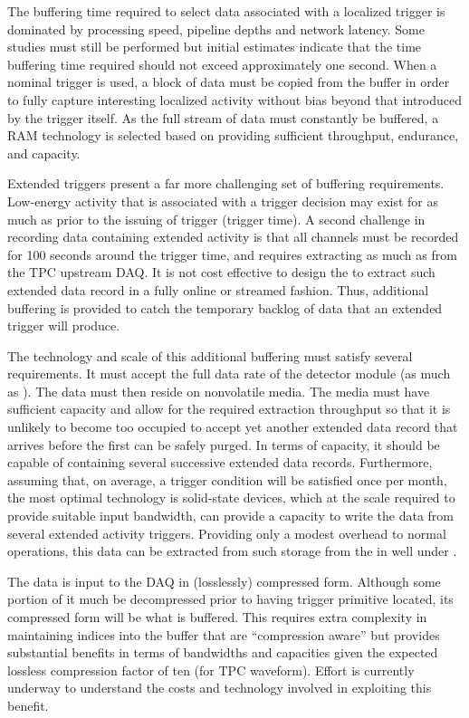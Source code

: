 The buffering time required to select data associated with a localized trigger
is dominated by processing speed, pipeline depths and network latency.
Some studies must still be performed but initial estimates indicate that the
time buffering time required should not exceed approximately one second. 
When a nominal trigger is used, a \dpreadout block of data must be copied from
the buffer in order to fully capture interesting localized activity without bias
beyond that introduced by the trigger itself.
As the full stream of data must constantly be buffered, a RAM technology is
selected based on providing sufficient throughput, endurance, and capacity. 

Extended triggers present a far more challenging set of buffering requirements.  
Low-energy activity that is associated with a  trigger decision may
exist for as much as \snbpretime prior to the issuing of  trigger
(trigger time).
A second challenge in recording data containing extended activity is that all
channels must be recorded for 100 seconds around the trigger time, and requires
extracting as much as  from the TPC upstream DAQ.
It is not cost effective to design the  to extract such extended data
record in a fully online or streamed fashion.
Thus, additional buffering is provided to catch the temporary backlog of data
that an extended trigger will produce.

The technology and scale of this additional buffering must satisfy several
requirements. 
It must accept the full data rate of the detector module (as much as ). 
The data must then reside on nonvolatile media. 
The media must have sufficient capacity and allow for the required extraction
throughput so that it is unlikely to become too occupied to accept yet another
extended data record that arrives before the first can be safely purged.
In terms of capacity, it should be capable of containing several successive
extended data records.
Furthermore, assuming that, on average, a  trigger condition will be
satisfied once per month, the most optimal technology is solid-state devices,
which at the scale required to provide suitable input bandwidth, can provide a
capacity to write the data from several extended activity triggers.
Providing only a modest overhead to normal operations, this data can be
extracted from such storage from the  in well under .

The data is input to the DAQ in (losslessly) compressed form. 
Although some portion of it much be decompressed prior to having trigger
primitive located, its compressed form will be what is buffered. 
This requires extra complexity in maintaining indices into the buffer that are
``compression aware'' but provides substantial benefits in terms of bandwidths
and capacities given the expected lossless compression factor of ten (for TPC
waveform).
Effort is currently underway to understand the costs and technology involved in
exploiting this benefit.

